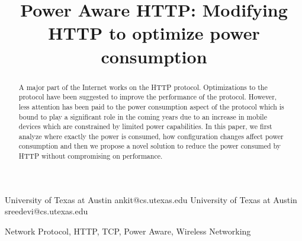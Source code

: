 \documentclass{sigplanconf}
\begin{document}
\setlength{\pdfpageheight}{\paperheight}
\setlength{\pdfpagewidth}{\paperwidth}






\title{Power Aware HTTP: Modifying HTTP to optimize power consumption}


{University of Texas at Austin}
           {ankit@cs.utexas.edu}
{University of Texas at Austin}
           {sreedevi@cs.utexas.edu}

\maketitle

\begin{abstract}
\noindent A major part of the Internet works on the HTTP protocol. Optimizations to the protocol have been suggested to improve the performance of the protocol. However, less attention has been paid to the power consumption aspect of the protocol which is bound to play a significant role in the coming years due to an increase in mobile devices which are constrained by limited power capabilities. In this paper, we first analyze where exactly the power is consumed, how configuration changes affect power consumption and then we propose a novel solution to reduce the power consumed by HTTP without compromising on performance. 

\end{abstract}


\keywords
Network Protocol, HTTP, TCP, Power Aware, Wireless Networking
\end{document}
